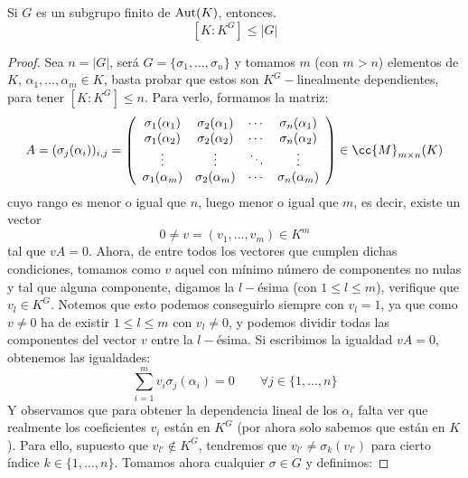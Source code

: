 \begin{prop}[Artin]\label{prop:artin}
    Si $G$ es un subgrupo finito de $\operatorname{Aut}(K)$, entonces.
    \begin{equation*}
        \left[K:K^G\right] \leq |G|
    \end{equation*}
    \begin{proof}
        Sea $n=|G|$, será $G = \{\sigma_1, \ldots, \sigma_n\}$ y tomamos $m$ (con $m>n$) elementos de $K$, $\alpha_1,\ldots,\alpha_m \in K$, basta probar que estos son $K^G-$linealmente dependientes, para tener $[K:K^G]\leq n$. Para verlo, formamos la matriz:
        \begin{equation*}
            A = (\sigma_{j}(\alpha_i))_{i,j} = \left(\begin{array}{cccc}
                \sigma_1(\alpha_1) & \sigma_2(\alpha_1) & \cdots & \sigma_n(\alpha_1) \\
                \sigma_1(\alpha_2) & \sigma_2(\alpha_2) & \cdots & \sigma_n(\alpha_2) \\
                \vdots & \vdots & \ddots & \vdots \\
                \sigma_1(\alpha_m) & \sigma_2(\alpha_m) & \cdots & \sigma_n(\alpha_m) 
            \end{array}\right) \in  \cc{M}_{m\times n}(K)
        \end{equation*}
        cuyo rango es menor o igual que $n$, luego menor o igual que $m$, es decir, existe un vector
        \begin{equation*}
            0\neq v = (v_1, \ldots, v_m) \in K^m
        \end{equation*}
        tal que $vA = 0$. Ahora, de entre todos los vectores que cumplen dichas condiciones, tomamos como $v$ aquel con mínimo número de componentes no nulas y tal que alguna componente, digamos la $l-$ésima (con $1\leq l\leq m$), verifique que $v_l \in K^G$. Notemos que esto podemos conseguirlo siempre con $v_l = 1$, ya que como $v\neq 0$ ha de existir $1\leq l\leq m$ con $v_l\neq 0$, y podemos dividir todas las componentes del vector $v$ entre la $l-$ésima. Si escribimos la igualdad $vA = 0$, obtenemos las igualdades:
        \begin{equation*}
            \sum_{i=1}^m v_i \sigma_j(\alpha_i) = 0 \qquad \forall j \in \{1,\ldots,n\}
        \end{equation*}
        Y observamos que para obtener la dependencia lineal de los $\alpha_i$ falta ver que realmente los coeficientes $v_i$ están en $K^G$ (por ahora solo sabemos que están en $K$). Para ello, supuesto que $v_{l'}\notin K^G$, tendremos que $v_{l'} \neq \sigma_k(v_{l'})$ para cierto índice $k\in \{1,\ldots,n\}$. Tomamos ahora cualquier $\sigma\in G$ y definimos:

\end{proof}
\end{prop}
